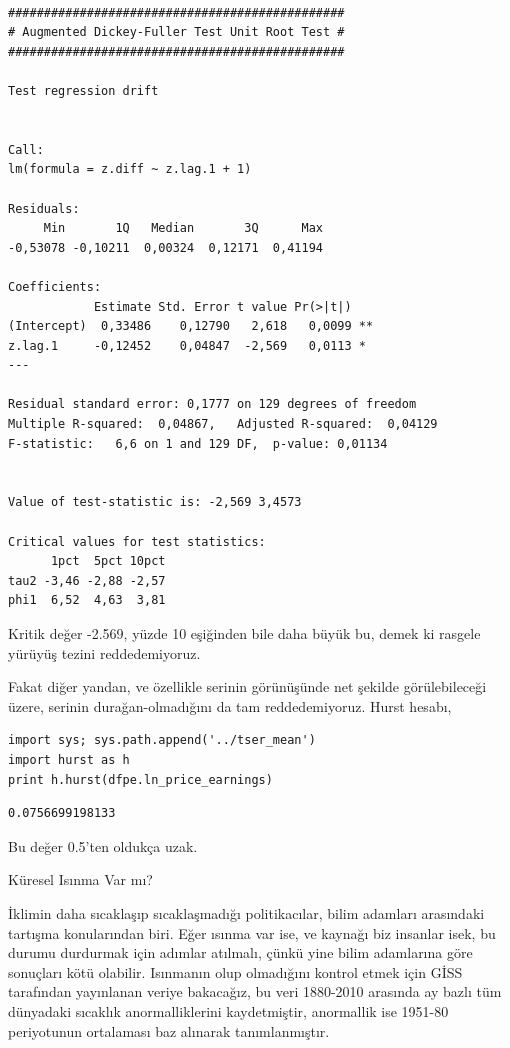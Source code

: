 \documentclass[12pt,fleqn]{article}\usepackage{../../common}
\begin{document}
\begin{verbatim}

############################################### 
# Augmented Dickey-Fuller Test Unit Root Test # 
############################################### 

Test regression drift 


Call:
lm(formula = z.diff ~ z.lag.1 + 1)

Residuals:
     Min       1Q   Median       3Q      Max 
-0,53078 -0,10211  0,00324  0,12171  0,41194 

Coefficients:
            Estimate Std. Error t value Pr(>|t|)   
(Intercept)  0,33486    0,12790   2,618   0,0099 **
z.lag.1     -0,12452    0,04847  -2,569   0,0113 * 
---

Residual standard error: 0,1777 on 129 degrees of freedom
Multiple R-squared:  0,04867,	Adjusted R-squared:  0,04129 
F-statistic:   6,6 on 1 and 129 DF,  p-value: 0,01134


Value of test-statistic is: -2,569 3,4573 

Critical values for test statistics: 
      1pct  5pct 10pct
tau2 -3,46 -2,88 -2,57
phi1  6,52  4,63  3,81
\end{verbatim}

Kritik değer -2.569, yüzde 10 eşiğinden bile daha büyük bu, demek ki
rasgele yürüyüş tezini reddedemiyoruz. 

Fakat diğer yandan, ve özellikle serinin görünüşünde net şekilde
görülebileceği üzere, serinin durağan-olmadığını da tam
reddedemiyoruz. Hurst hesabı,

\begin{verbatim}
import sys; sys.path.append('../tser_mean')
import hurst as h
print h.hurst(dfpe.ln_price_earnings)
\end{verbatim}

\begin{verbatim}
0.0756699198133
\end{verbatim}

Bu değer 0.5'ten oldukça uzak.

Küresel Isınma Var mı?

İklimin daha sıcaklaşıp sıcaklaşmadığı politikacılar, bilim adamları
arasındaki tartışma konularından biri. Eğer ısınma var ise, ve kaynağı biz
insanlar isek, bu durumu durdurmak için adımlar atılmalı, çünkü yine bilim
adamlarına göre sonuçları kötü olabilir. Isınmanın olup olmadığını kontrol
etmek için GİSS tarafından yayınlanan veriye bakacağız, bu veri 1880-2010
arasında ay bazlı tüm dünyadaki sıcaklık anormalliklerini kaydetmiştir,
anormallik ise 1951-80 periyotunun ortalaması baz alınarak tanımlanmıştır.
\end{document}
